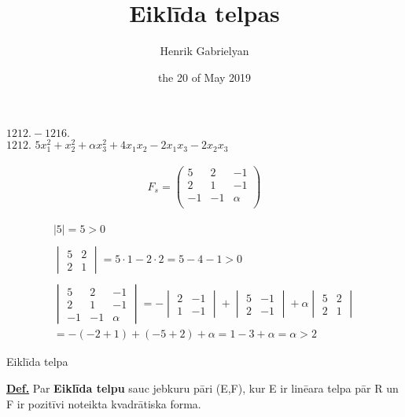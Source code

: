 \documentclass[12pt]{article}
\title{Eiklīda telpas}
\author{Henrik Gabrielyan}
\date{the 20 of May 2019}
\begin{document}
\maketitle
 
\underline{$1212. - 1216.$}\\

$1212.$  $ 5x_1^2 + x_2^2 +  \alpha x_3^2 + 4x_1x_2-2x_1x_3-2x_2x_3$

\begin{gather*}
F_s = 
\begin{pmatrix}
   5 & 2 & -1 \\
   2 & 1 & -1 \\
   -1 & -1 & \alpha \\
\end{pmatrix}
\end {gather*}

\begin{gather*}
	|5| = 5 > 0 \quad \quad \\ \\
	\begin{vmatrix} 
		5 & 2 \\
		2 & 1 
	\end{vmatrix}
 	= 5 \cdot 1 - 2 \cdot 2  = 5 - 4 - 1 > 0 \\ \\
 	\begin{vmatrix} 
		5 & 2 & -1 \\
		2 & 1 & -1 \\
		-1 & -1 & \alpha
	\end{vmatrix}
	= -
	\begin{vmatrix}
	2 & -1 \\
	1 & -1
	\end{vmatrix}
	+
	\begin{vmatrix}
	5 & -1 \\
	2 & -1  
	\end{vmatrix}
	+ \alpha
	\begin{vmatrix}
	5 & 2 \\
	2 & 1 
	\end{vmatrix} \\ 
	= -(-2 + 1) + (-5 + 2) + \alpha = 1 - 3 + \alpha = \alpha  > 2 
\end{gather*}
\pagebreak


Eiklīda telpa

\textbf{\underline{Def.}} Par \textbf{Eiklīda telpu} sauc jebkuru pāri (E,F), kur E ir linēara telpa pār R un F ir pozitīvi noteikta kvadrātiska forma.
\end{document}
